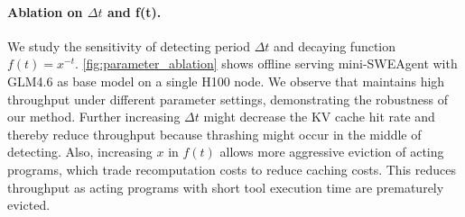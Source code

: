 \paragraph{Ablation on $\Delta t$ and f(t).} We study the sensitivity of detecting period $\Delta t$ and decaying function $f(t) = x^{-t}$. \autoref{fig:parameter_ablation}
 shows \ouralg offline serving mini-SWEAgent with GLM4.6 as base model on a single H100 node. We observe that \ouralg maintains high throughput under different parameter settings, demonstrating the robustness of our method. Further increasing $\Delta t$ might decrease the KV cache hit rate and thereby reduce throughput because thrashing might occur in the middle of detecting. Also, increasing $x$ in $f(t)$ allows more aggressive eviction of acting programs, which trade recomputation costs to reduce caching costs. This reduces throughput as acting programs
with short tool execution time are prematurely evicted.%

